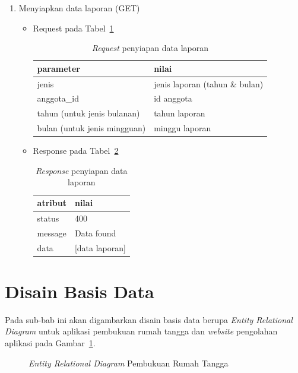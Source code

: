 \begin{enumerate}
		\item Menyiapkan data laporan (GET)
		\begin{itemize}
			\item Request pada Tabel~\ref{tab:request_laporan}
				\begin{table}[h]
					\centering
						\begin{tabular}{ |p{4cm}|p{10cm}|}
							\hline
							parameter & nilai \\ \hline
							jenis & jenis laporan (tahun \& bulan) \\ \hline
							anggota\_id & id anggota \\ \hline
							tahun (untuk jenis bulanan) & tahun laporan \\ \hline
							bulan (untuk jenis mingguan) & minggu laporan \\ \hline
					\end{tabular}
					\caption{\textit{Request} penyiapan data laporan}
					\label{tab:request_laporan}
				\end{table}
			\item Response pada Tabel~\ref{tab:response_laporan}
				\begin{table}[!h]
					\centering
						\begin{tabular}{ |p{4cm}|p{10cm}|}
							\hline
							atribut & nilai \\ \hline
							status & 400\\ \hline
							message & Data found \\ \hline
							data & [data laporan] \\ \hline
						\end{tabular}
						\caption{\textit{Response} penyiapan data laporan}
					\label{tab:response_laporan}
				\end{table}
		\end{itemize}
\end{enumerate}

\section{Disain Basis Data}
\label{sec:disainbasisdata}

\hspace{0,5cm}Pada sub-bab ini akan digambarkan disain basis data berupa \textit{Entity Relational Diagram} untuk aplikasi pembukuan rumah tangga dan \textit{website} pengolahan aplikasi pada Gambar~\ref{fig:er_diagram_prt}.

\begin{figure}[h!]
\centering
{}
\caption[\textit{Entity Relational Diagram} Pembukuan Rumah Tangga]{\textit{Entity Relational Diagram} Pembukuan Rumah Tangga} 
\label{fig:er_diagram_prt}
\end{figure}


